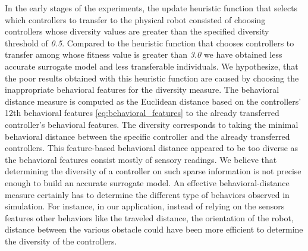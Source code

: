 In the early stages of the experiments, the update heuristic function that selects which controllers to transfer to the physical robot consisted of choosing controllers whose diversity values are greater than the specified diversity threshold of \textit{0.5}. Compared to the heuristic function that chooses controllers to transfer among whose fitness value is greater than \textit{3.0} we have obtained less accurate surrogate model and less transferable individuals. We hypothesize, that the poor results obtained with this heuristic function are caused by choosing the inappropriate behavioral features for the diversity measure. The behavioral distance measure is computed as the Euclidean distance based on the controllers' 12th behavioral features \ref{eq:behavioral_features} to the already transferred controller's behavioral features. The diversity corresponds to taking the minimal behavioral distance between the specific controller and the already transferred controllers. This feature-based behavioral distance appeared to be too diverse as the behavioral features consist mostly of sensory readings. We believe that determining the diversity of a controller on such sparse information is not precise enough to build an accurate surrogate model. An effective behavioral-distance measure certainly has to determine the different type of behaviors observed in simulation. For instance, in our application, instead of relying on the sensors features other behaviors like the traveled distance, the orientation of the robot, distance between the various obstacle could have been more efficient to determine the diversity of the controllers.




